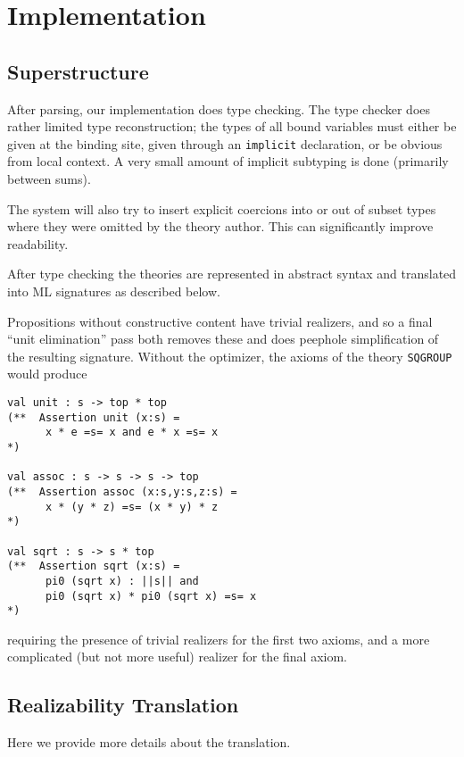 
\section{Implementation}
\label{sec:implementation}

\subsection{Superstructure}

After parsing, our implementation does type checking.  The type
checker does rather limited type reconstruction; the types of all
bound variables must either be given at the binding site, given
through an \Verb|implicit| declaration, or be obvious from local
context.  A very small amount of implicit subtyping is done (primarily
between sums).  

The system will also try to insert explicit coercions into or out of
subset types where they were omitted by the theory author.  This can
significantly improve readability.  

After type checking the theories are represented in abstract syntax and
translated into ML signatures as described below.  

Propositions without constructive content have trivial realizers, and
so a final ``unit elimination'' pass both removes these and does 
peephole simplification of the resulting signature.   Without the optimizer,
the axioms of the theory \Verb|SQGROUP| would produce
\begin{Verbatim}
val unit : s -> top * top
(**  Assertion unit (x:s) =  
      x * e =s= x and e * x =s= x
*)
   
val assoc : s -> s -> s -> top
(**  Assertion assoc (x:s,y:s,z:s) =
      x * (y * z) =s= (x * y) * z
*)
   
val sqrt : s -> s * top
(**  Assertion sqrt (x:s) =  
      pi0 (sqrt x) : ||s|| and 
      pi0 (sqrt x) * pi0 (sqrt x) =s= x
*)
\end{Verbatim}
requiring the presence of trivial realizers for the first two axioms,
and a more complicated (but not more useful) realizer for the final
axiom.

\subsection{Realizability Translation}
Here we provide more details about the translation.



